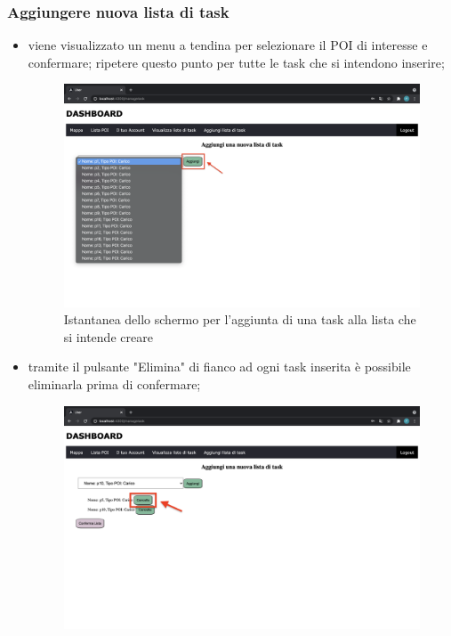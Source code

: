 \subsubsection{Aggiungere nuova lista di task}
\begin{itemize}
    \item viene visualizzato un menu a tendina per selezionare  il POI di interesse e confermare; ripetere questo punto per tutte le task che si intendono inserire;
     \begin{figure}[H]
        \centering
        \includegraphics[scale=0.2]{res/images/aggiungitask.png}
        \caption{Istantanea dello schermo per l'aggiunta di una task alla lista che si intende creare}
    \end{figure}
    \item tramite il pulsante "Elimina" di fianco ad ogni task inserita è possibile eliminarla prima di confermare;
    \begin{figure}[H]
        \centering
        \includegraphics[scale=0.12]{res/images/eliminatask.png}

\end{figure}
\end{itemize}
